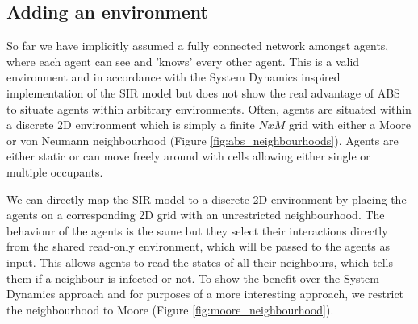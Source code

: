 \subsection{Adding an environment}
\label{sec:adding_env}
So far we have implicitly assumed a fully connected network amongst agents, where each agent can see and 'knows' every other agent. This is a valid environment and in accordance with the System Dynamics inspired implementation of the SIR model but does not show the real advantage of ABS to situate agents within arbitrary environments. Often, agents are situated within a discrete 2D environment \cite{epstein_growing_1996} which is simply a finite $N x M$ grid with either a Moore or von Neumann neighbourhood (Figure \ref{fig:abs_neighbourhoods}). Agents are either static or can move freely around with cells allowing either single or multiple occupants.

We can directly map the SIR model to a discrete 2D environment by placing the agents on a corresponding 2D grid with an unrestricted neighbourhood. The behaviour of the agents is the same but they select their interactions directly from the shared read-only environment, which will be passed to the agents as input. This allows agents to read the states of all their neighbours, which tells them if a neighbour is infected or not. To show the benefit over the System Dynamics approach  and for purposes of a more interesting approach, we restrict the neighbourhood to Moore (Figure \ref{fig:moore_neighbourhood}).

